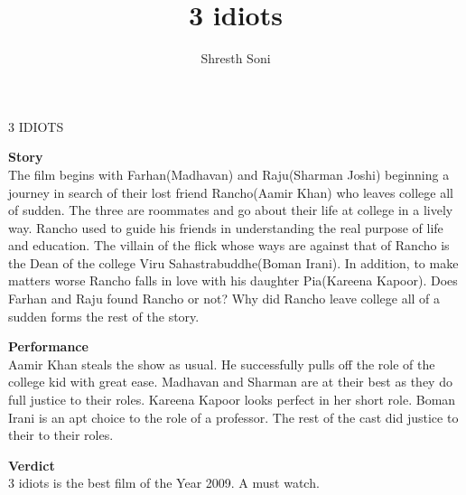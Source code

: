 \documentclass{article}
\title{ 3 idiots}
\author{Shresth Soni}
\begin{document}
\begin{center}
\textmd {\huge 3 IDIOTS}
\end{center}

\begin{flushleft}
\textbf{Story}\\
The film begins with Farhan(Madhavan) and Raju(Sharman Joshi) beginning a journey in search of their lost friend Rancho(Aamir Khan) who leaves college all of sudden. The three are roommates and go about their life at college in a lively way. Rancho used to guide his friends in understanding the real purpose of life and education. The villain of the flick whose ways are against that of Rancho is the Dean of the college Viru Sahastrabuddhe(Boman Irani). In addition, to make matters worse Rancho falls in love with his daughter Pia(Kareena Kapoor). Does Farhan and Raju found Rancho or not? Why did Rancho leave college all of a sudden forms the rest of the story.\\
\vspace{3mm}

\textbf{Performance}\\
Aamir Khan steals the show as usual. He successfully pulls off the role of the college kid with great ease. Madhavan and Sharman are at their best as they do full justice to their roles. Kareena Kapoor looks perfect in her short role. Boman Irani is an apt choice to the role of a professor. The rest of the cast did justice to their to their roles.\\
\vspace{3mm}

\textbf{Verdict}\\
3 idiots is the best film of the Year 2009. A must watch.

\end{flushleft}
\end{document}
